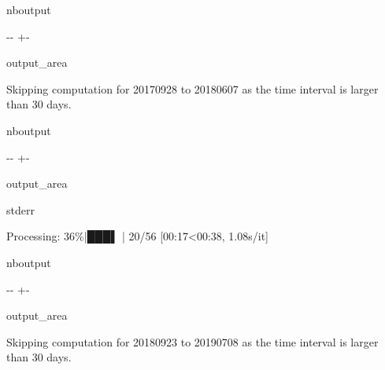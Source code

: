 \documentclass[letterpaper,10pt,english]{sphinxmanual}
\begin{document}
\begin{sphinxuseclass}{nboutput}
{

\kern-\sphinxverbatimsmallskipamount\kern-\baselineskip
\kern+\FrameHeightAdjust\kern-\fboxrule
\vspace{\nbsphinxcodecellspacing}

\begin{sphinxuseclass}{output_area}
\begin{sphinxuseclass}{}


\begin{sphinxVerbatim}[commandchars=\\\{\}]
Skipping computation for 20170928 to 20180607 as the time interval is larger than 30 days.
\end{sphinxVerbatim}



\end{sphinxuseclass}
\end{sphinxuseclass}
}

\end{sphinxuseclass}
\begin{sphinxuseclass}{nboutput}
{

\kern-\sphinxverbatimsmallskipamount\kern-\baselineskip
\kern+\FrameHeightAdjust\kern-\fboxrule
\vspace{\nbsphinxcodecellspacing}

\begin{sphinxuseclass}{output_area}
\begin{sphinxuseclass}{stderr}


\begin{sphinxVerbatim}[commandchars=\\\{\}]
Processing:  36\%|███▌      | 20/56 [00:17<00:38,  1.08s/it]
\end{sphinxVerbatim}



\end{sphinxuseclass}
\end{sphinxuseclass}
}

\end{sphinxuseclass}
\begin{sphinxuseclass}{nboutput}
{

\kern-\sphinxverbatimsmallskipamount\kern-\baselineskip
\kern+\FrameHeightAdjust\kern-\fboxrule
\vspace{\nbsphinxcodecellspacing}

\begin{sphinxuseclass}{output_area}
\begin{sphinxuseclass}{}


\begin{sphinxVerbatim}[commandchars=\\\{\}]
Skipping computation for 20180923 to 20190708 as the time interval is larger than 30 days.
\end{sphinxVerbatim}



\end{sphinxuseclass}
\end{sphinxuseclass}
}

\end{sphinxuseclass}
\end{document}
